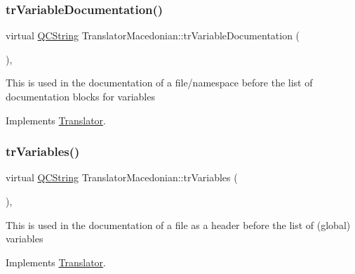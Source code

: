 \mbox{\label{class_translator_macedonian_a345e348188ccf52be6f609a6cd39ff54}} 
\subsubsection{\texorpdfstring{trVariableDocumentation()}{trVariableDocumentation()}}
{\footnotesize\ttfamily virtual \mbox{\hyperlink{class_q_c_string}{Q\+C\+String}} Translator\+Macedonian\+::tr\+Variable\+Documentation (\begin{DoxyParamCaption}{ }\end{DoxyParamCaption})\hspace{0.3cm}{\ttfamily [inline]}, {\ttfamily [virtual]}}

This is used in the documentation of a file/namespace before the list of documentation blocks for variables 

Implements \mbox{\hyperlink{class_translator}{Translator}}.

\mbox{\label{class_translator_macedonian_a6952b2279a7f502790d8e7e10515b9a5}} 
\subsubsection{\texorpdfstring{trVariables()}{trVariables()}}
{\footnotesize\ttfamily virtual \mbox{\hyperlink{class_q_c_string}{Q\+C\+String}} Translator\+Macedonian\+::tr\+Variables (\begin{DoxyParamCaption}{ }\end{DoxyParamCaption})\hspace{0.3cm}{\ttfamily [inline]}, {\ttfamily [virtual]}}

This is used in the documentation of a file as a header before the list of (global) variables 

Implements \mbox{\hyperlink{class_translator}{Translator}}.

\mbox{\label{class_translator_macedonian_a7b30e27482f4bab01d330f9ebf5afb64}} 
